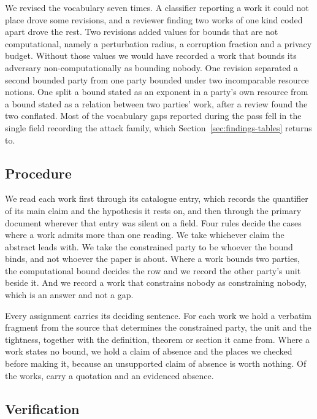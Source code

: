 We revised the vocabulary seven times. A classifier reporting a work it could
not place drove some revisions, and a reviewer finding two works of one kind
coded apart drove the rest. Two revisions added values for bounds that are not
computational, namely a perturbation radius, a corruption fraction and a
privacy budget. Without those values we would have recorded a work that bounds
its adversary non-computationally as bounding nobody. One revision separated a
second bounded party from one party bounded under two incomparable resource
notions. One split a bound stated as an exponent in a party's own resource
from a bound stated as a relation between two parties' work, after a review
found the two conflated. Most of the vocabulary gaps reported during the pass
fell in the single field recording the attack family, which
Section~\ref{sec:findings-tables} returns to.

\subsection{Procedure}

We read each work first through its catalogue entry, which records the
quantifier of its main claim and the hypothesis it rests on, and then through
the primary document wherever that entry was silent on a field. Four rules
decide the cases where a work admits more than one reading. We take whichever claim the abstract leads with. We take the constrained party to be whoever the bound
binds, and not whoever the paper is about. Where a work bounds two parties,
the computational bound decides the row and we record the other party's unit
beside it. And we record a work that constrains nobody as constraining nobody,
which is an answer and not a gap.

Every assignment carries its deciding sentence. For each work we hold a
verbatim fragment from the source that determines the constrained party, the
unit and the tightness, together with the definition, theorem or section it
came from. Where a work states no bound, we hold a claim of absence and the
places we checked before making it, because an unsupported claim of absence is
worth nothing. Of the \NumSources{} works, \QuoteOnFile{} carry a quotation
and
\QuoteAbsent{} an evidenced absence.

\subsection{Verification}

